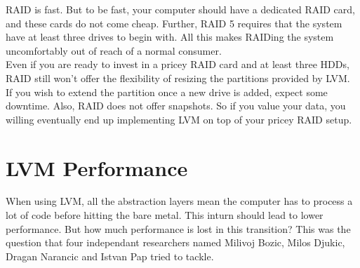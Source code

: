 RAID is fast. But to be fast, your computer should have a dedicated RAID card,
and these cards do not come cheap. Further, RAID 5 requires that the system have
at least three drives to begin with. All this makes RAIDing the system
uncomfortably out of reach of a normal consumer.\\

Even if you are ready to invest in a pricey RAID card and at least three HDDs,
RAID still won't offer the flexibility of resizing the partitions provided by
LVM. If you wish to extend the partition once a new drive is added, expect some
downtime. Also, RAID does not offer snapshots. So if you value your data, you
willing eventually end up implementing LVM on top of your pricey RAID setup.


\chapter{LVM Performance}
When using LVM, all the abstraction layers mean the computer has to process a
lot of code before hitting the bare metal. This inturn should lead to lower
performance. But how much performance is lost in this transition? This was the
question that four independant researchers named Milivoj Bozic, Milos Djukic,
Dragan Narancic and Istvan Pap tried to tackle.
